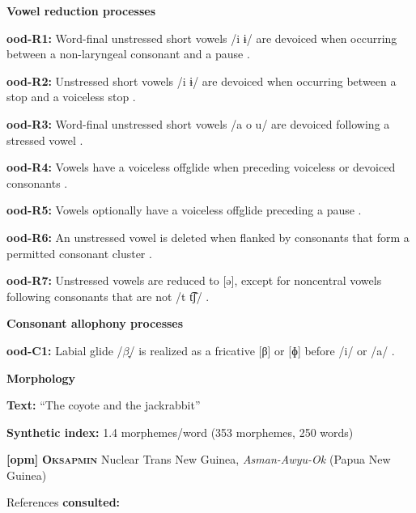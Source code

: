 \textbf{Vowel reduction processes}



\textbf{ood-R1:} Word-final unstressed short vowels /i ɨ/ are devoiced when occurring between a non-laryngeal consonant and a pause \citep[31]{Saxton1963}.



\textbf{ood-R2:} Unstressed short vowels /i ɨ/ are devoiced when occurring between a stop and a voiceless stop \citep[31]{Saxton1963}.



\textbf{ood-R3:} Word-final unstressed short vowels /a o u/ are devoiced following a stressed vowel \citep[31]{Saxton1963}.



\textbf{ood-R4:} Vowels have a voiceless offglide when preceding voiceless or devoiced consonants \citep[31]{Saxton1963}.



\textbf{ood-R5:} Vowels optionally have a voiceless offglide preceding a pause \citep[31]{Saxton1963}.



\textbf{ood-R6:} An unstressed vowel is deleted when flanked by consonants that form a permitted consonant cluster \citep[103]{Saxton1982}.



\textbf{ood-R7:} Unstressed vowels are reduced to [ə], except for noncentral vowels following consonants that are not /t t͡ʃ/ \citep[104]{Saxton1982}.



\textbf{Consonant allophony processes}



\textbf{ood-C1:} Labial glide /$\beta ̞$/ is realized as a fricative [β] or [ɸ] before /i/ or /a/ \citep[31]{Saxton1963}.



\textbf{Morphology}



\textbf{Text:} “The coyote and the jackrabbit” \citep[263-266]{Saxton1982}



\textbf{Synthetic index:} 1.4 morphemes/word (353 morphemes, 250 words)



\textbf{[opm]}   \textbf{\textsc{Oksapmin}}  Nuclear Trans New Guinea, \textit{Asman-Awyu-Ok} (Papua New Guinea)



References \textbf{consulted:} \citet{Loughnane2009}



